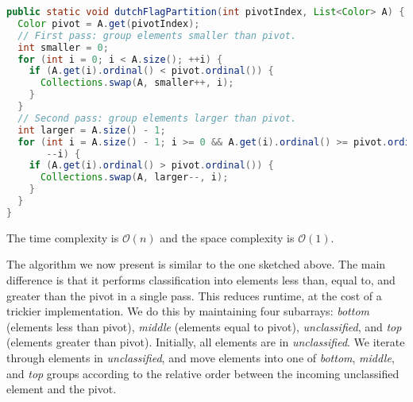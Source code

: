 \documentclass[10pt,openany,twoside,letterpaper,extrafontsizes]{memoir}
\newif\ifPython
\newcommand{\myindex}[1]{%
\index[terms]{#1}%
}
\begin{document}
\begin{Spacing}{\arraysSpacing}
\begin{lstlisting}[language=Java]
public static void dutchFlagPartition(int pivotIndex, List<Color> A) {
  Color pivot = A.get(pivotIndex);
  // First pass: group elements smaller than pivot.
  int smaller = 0;
  for (int i = 0; i < A.size(); ++i) {
    if (A.get(i).ordinal() < pivot.ordinal()) {
      Collections.swap(A, smaller++, i);
    }
  }
  // Second pass: group elements larger than pivot.
  int larger = A.size() - 1;
  for (int i = A.size() - 1; i >= 0 && A.get(i).ordinal() >= pivot.ordinal();
       --i) {
    if (A.get(i).ordinal() > pivot.ordinal()) {
      Collections.swap(A, larger--, i);
    }
  }
}
\end{lstlisting}
\fi%
\ifPython
\begin{lstlisting}[language=Python]
RED, WHITE, BLUE = range(3)


def dutch_flag_partition(pivot_index, A):
    pivot = A[pivot_index]
    # First pass: group elements smaller than pivot.
    smaller = 0
    for i in range(len(A)):
        if A[i] < pivot:
            A[i], A[smaller] = A[smaller], A[i]
            smaller += 1
    # Second pass: group elements larger than pivot.
    larger = len(A) - 1
    for i in reversed(range(len(A))):
        if A[i] < pivot:
            break
        elif A[i] > pivot:
            A[i], A[larger] = A[larger], A[i]
            larger -= 1
\end{lstlisting}
\fi%
The time complexity is $\mathcal{O}(n)$ and the space complexity  is $\mathcal{O}(1)$.

The algorithm we now present is similar to the one sketched above.
The main difference is that it performs classification into elements less than, equal to, and greater than the pivot in a single pass.
This reduces runtime, at the cost of a trickier implementation.
We do this by maintaining four subarrays:
{\em bottom} (elements less than pivot), {\em middle} (elements equal to pivot), {\em unclassified}, and {\em top} (elements greater than pivot).
Initially, all elements are in {\em unclassified}.
We iterate through elements in {\em unclassified}, and move elements into one of {\em bottom}, {\em middle}, and {\em top} groups according to the relative order between the incoming unclassified element and the pivot.


\end{Spacing}
\end{document}
